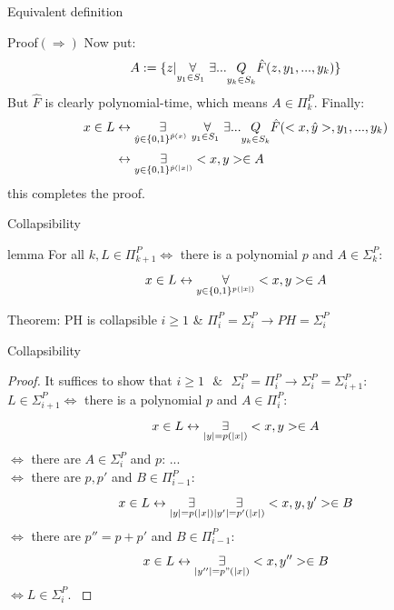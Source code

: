         \begin{frame}{Equivalent definition}
            \begin{block}{Proof$(\Rightarrow)$}
                Now put:\\
                $$ A:= \{z| 
                \overset{{}}{\underset{{y_1 \in S_1\ }}{\Large \forall}}
                \exists ...\underset{y_k \in S_k}{Q} 
                \hat{F}(z,y_1,...,y_k)\} $$
                But $\hat{F}$ is clearly polynomial-time, which means
                $A \in \Pi_k^P$.
                Finally:
                \begin{align*}
                    x \in L  
                    & \leftrightarrow
                    \overset{{}}{\underset{{\hat{y} \in {\{0,1\}}^{\hat{p}(x)}\ }}{\Large \exists}}
                    \overset{{}}{\underset{{y_1 \in S_1\ }}{\Large \forall}}
                    \exists ...\underset{y_k \in S_k}{Q} 
                    \hat{F}(<x,\hat{y}>,y_1,...,y_k)\\
                    & \leftrightarrow
                    \overset{{}}{\underset{{y\in \{0,1\}^{\hat{p}(|x|)}}}{\Large \exists}} <x,y> \in A
                    \end{align*}
                this completes the proof.
            \end{block}
        \end{frame}
            
        \begin{frame}{Collapsibility}
            \begin{block}{lemma}
                For all $k, L \in  \Pi_{k+1}^P \iff $
                there is a polynomial $p$ and $A \in \Sigma_k^P$:
                $$x \in L \leftrightarrow 
                \overset{{}}{\underset{{y\in \{0,1\}^{p(|x|)}}}{\Large \forall}} <x,y> \in A$$
            \end{block}
            \pause
            \begin{block}{Theorem: PH is collapsible}            
                $i \geq 1 $ \& $ \Pi_i^P = \Sigma_i^P \to PH = \Sigma_i^P$
            \end{block}
        \end{frame}

        \begin{frame}{Collapsibility}
            \begin{proof}
                \small{
                It suffices to show that 
                $i\geq1 \text{ $\&$ } \Sigma_i^P = \Pi_i^P 
                \to \Sigma_i^P = \Sigma_{i+1}^P$:\\
                $L \in \Sigma_{i+1}^P \iff$ there is a polynomial $p$ and $A \in \Pi_i^P$:
                $$x \in L \leftrightarrow \overset{{}}{\underset{{|y|=p(|x|)}}{\Large \exists}} <x,y> \in A$$
                $\iff$ there are $A \in \Sigma_i^P$ and $p$:
                 $...$\\
                $\iff$ there are $p,p'$ and $B \in \Pi_{i-1}^P$:
                $$x \in L \leftrightarrow \overset{{}}{\underset{{|y|=p(|x|)}}{\Large \exists}} \overset{{}}{\underset{{|y'|=p'(|x|)}}{\Large \exists}} <x,y,y'> \in B$$
                $\iff$ there are $p'' = p+p'$ and $B \in \Pi_{i-1}^P$:
                $$x \in L \leftrightarrow \overset{{}}{\underset{{|y''|=p"(|x|)}}{\Large \exists}} <x,y''> \in B$$
                $\iff L \in \Sigma_i^P$.
                }
            \end{proof}
        \end{frame}

